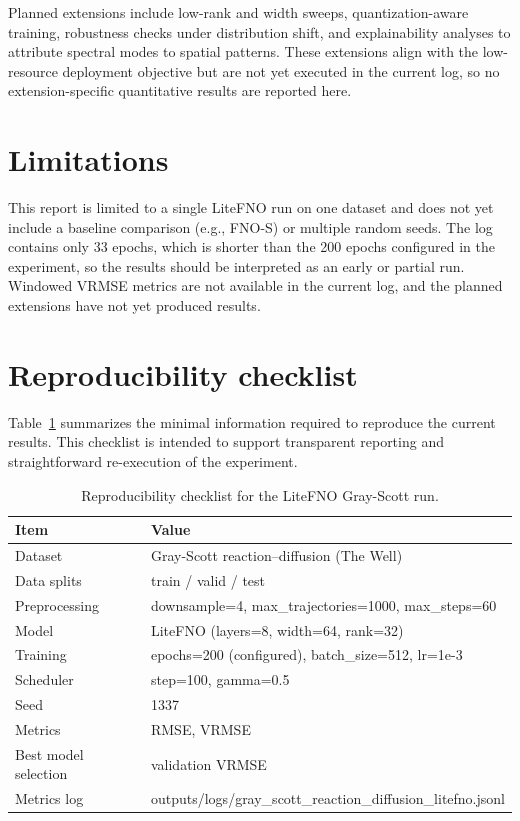 \documentclass[11pt]{article}
\begin{document}
Planned extensions include low-rank and width sweeps, quantization-aware
training, robustness checks under distribution shift, and explainability
analyses to attribute spectral modes to spatial patterns. These extensions align
with the low-resource deployment objective but are not yet executed in the
current log, so no extension-specific quantitative results are reported here.

\section{Limitations}
This report is limited to a single LiteFNO run on one dataset and does not yet
include a baseline comparison (e.g., FNO-S) or multiple random seeds. The log
contains only 33 epochs, which is shorter than the 200 epochs configured in the
experiment, so the results should be interpreted as an early or partial run.
Windowed VRMSE metrics are not available in the current log, and the planned
extensions have not yet produced results.

\section{Reproducibility checklist}
Table~\ref{tab:repro} summarizes the minimal information required to reproduce
the current results. This checklist is intended to support transparent reporting
and straightforward re-execution of the experiment.

\begin{table}[t]
  \centering
  \caption{Reproducibility checklist for the LiteFNO Gray-Scott run.}
  \label{tab:repro}
  \begin{tabular}{ll}
    \toprule
    Item & Value \\
    \midrule
    Dataset & Gray-Scott reaction--diffusion (The Well) \\
    Data splits & train / valid / test \\
    Preprocessing & downsample=4, max\_trajectories=1000, max\_steps=60 \\
    Model & LiteFNO (layers=8, width=64, rank=32) \\
    Training & epochs=200 (configured), batch\_size=512, lr=1e{-}3 \\
    Scheduler & step=100, gamma=0.5 \\
    Seed & 1337 \\
    Metrics & RMSE, VRMSE \\
    Best model selection & validation VRMSE \\
    Metrics log & outputs/logs/gray\_scott\_reaction\_diffusion\_litefno.jsonl \\
    \bottomrule
  \end{tabular}
\end{table}
\end{document}
